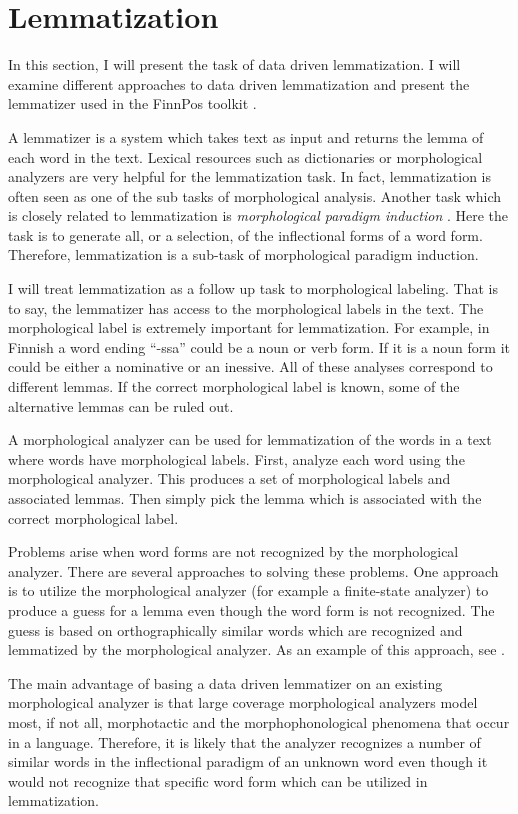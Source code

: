 \chapter{Lemmatization}
\label{chapter:lemmatization}

In this section, I will present the task of data driven
lemmatization. I will examine different approaches to data driven
lemmatization and present the lemmatizer used in the FinnPos toolkit
\cite{Silfverberg2015}.

A lemmatizer is a system which takes text as input and returns the
lemma of each word in the text. Lexical resources such as dictionaries
or morphological analyzers are very helpful for the lemmatization
task. In fact, lemmatization is often seen as one of the sub tasks of
morphological analysis. Another task which is closely related to
lemmatization is {\it morphological paradigm induction}
\citep{Ahlberg2014}. Here the task is to generate all, or a
selection, of the inflectional forms of a word form. Therefore,
lemmatization is a sub-task of morphological paradigm induction.

I will treat lemmatization as a follow up task to morphological
labeling. That is to say, the lemmatizer has access to the
morphological labels in the text. The morphological label is extremely
important for lemmatization. For example, in Finnish a word ending
``-ssa'' could be a noun or verb form. If it is a noun form it could
be either a nominative or an inessive. All of these analyses
correspond to different lemmas. If the correct morphological label is
known, some of the alternative lemmas can be ruled out.

A morphological analyzer can be used for lemmatization of the words in
a text where words have morphological labels. First, analyze each word
using the morphological analyzer. This produces a set of morphological
labels and associated lemmas. Then simply pick the lemma which is
associated with the correct morphological label.

Problems arise when word forms are not recognized by the morphological
analyzer. There are several approaches to solving these problems. One
approach is to utilize the morphological analyzer (for example a
finite-state analyzer) to produce a guess for a lemma even though the
word form is not recognized. The guess is based on orthographically
similar words which are recognized and lemmatized by the morphological
analyzer. As an example of this approach, see \cite{Linden2009}.

The main advantage of basing a data driven lemmatizer on an existing
morphological analyzer is that large coverage morphological analyzers
model most, if not all, morphotactic and the morphophonological
phenomena that occur in a language. Therefore, it is likely that the
analyzer recognizes a number of similar words in the inflectional paradigm
of an unknown word even though it would not recognize that specific
word form which can be utilized in lemmatization. 

